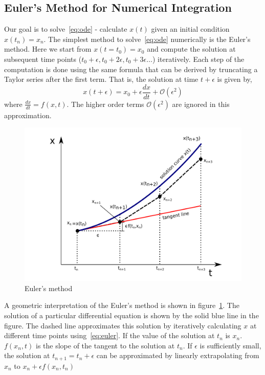 \documentclass[10pt,letterpaper]{article}
\begin{document}
\subsection*{Euler's Method for Numerical Integration}
Our goal is to solve~\ref{eq:ode} - calculate $x(t)$ given an initial condition $x(t_n)=x_{n}$. The simplest method to solve~\ref{eq:ode} numerically is the Euler's method. Here we start from $x(t=t_{0})=x_{0}$ and compute the solution at subsequent time points ($t_{0}+\epsilon,t_{0}+2\epsilon,t_{0}+3\epsilon \dots $) iteratively. Each step of the computation is done using the same formula that can be derived by truncating a Taylor series after the first term. That is, the solution at time $t+\epsilon$ is given by,
\begin{equation}
x(t+\epsilon) = x_{0} + \epsilon\frac{dx}{dt} + \mathcal{O}(\epsilon^2)
\label{eq:euler}
\end{equation}
where $\frac{dx}{dt}=f(x,t)$. The higher order terms $\mathcal{O}(\epsilon^2)$ are ignored in this approximation. 

\begin{figure}
\includegraphics[scale=0.4]{Figures/fig1.pdf} 
\caption{Euler's method}
\label{fig:euler}
\end{figure}

A geometric interpretation of the Euler's method is shown in figure~\ref{fig:euler}. The solution of a particular differential equation is shown by the solid blue line in the figure. The dashed line approximates this solution by iteratively calculating $x$ at different time points using~\ref{eq:euler}. If the value of the solution at $t_{n}$ is $x_{n}$. $f(x_{n},t)$ is the slope of the tangent to the solution at $t_{n}$. If $\epsilon$ is sufficiently small, the solution at $t_{n+1}=t_{n}+\epsilon$ can be approximated by linearly extrapolating from $x_{n}$ to $x_{n} + \epsilon f(x_{n},t_{n})$
\end{document}
